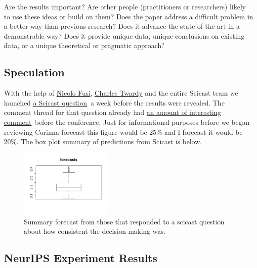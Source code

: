 Are the results important? Are other people (practitioners or
researchers) likely to use these ideas or build on them? Does the paper
address a difficult problem in a better way than previous research? Does
it advance the state of the art in a demonstrable way? Does it provide
unique data, unique conclusions on existing data, or a unique
theoretical or pragmatic approach?

\hypertarget{speculation}{%
\subsection{Speculation}\label{speculation}}

\begin{flushright}
\end{flushright}

With the help of \href{http://nicolofusi.com/}{Nicolo Fusi},
\href{http://blog.scicast.org/tag/charles-twardy/}{Charles Twardy} and
the entire Scicast team we launched
\href{https://scicast.org/\#!/questions/1083/trades/create/power}{a
Scicast question}~a week before the results were revealed. The comment
thread for that question already had
\href{https://scicast.org/\#!/questions/1083/comments/power}{an amount
of interesting comment}~before the conference. Just for informational
purposes before we began reviewing Corinna forecast this figure would be
25\% and I forecast it would be 20\%. The box plot summary of
predictions from Scicast is below.

\begin{figure}[htb]
\begin{center}
\includegraphics[width=0.40\textwidth]{diagrams/neurips/scicast-forecast.png}
\end{center}


\caption{Summary forecast from those that responded to a scicast question about how consistent the decision making was.}
\label{scicast-forecast}
\end{figure}

\hypertarget{neurips-experiment-results}{%
\subsection{NeurIPS Experiment
Results}\label{neurips-experiment-results}}

